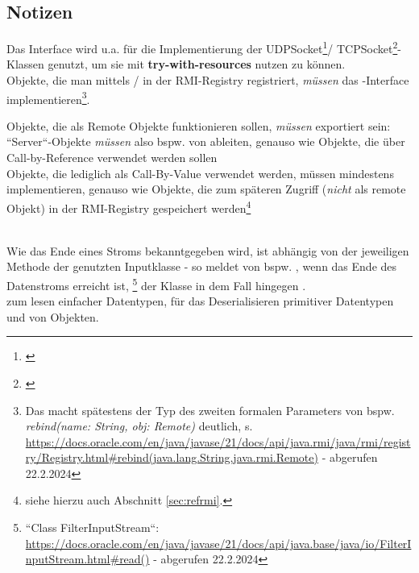 \subsection{Notizen}
Das Interface  wird u.a. für die Implementierung der UDPSocket\footnote{\cite[269, Listing 5.1]{Oec22}}/ TCPSocket\footnote{\cite[286, Listing 5.7]{Oec22}}-Klassen genutzt, um sie mit \textbf{try-with-resources} nutzen zu können.\\

\noindent
Objekte, die man mittels /  in der RMI-Registry registriert, \textit{müssen} das -Interface implementieren\footnote{
Das macht spätestens der Typ des zweiten formalen Parameters von bspw. \textit{rebind(name: String, obj: Remote)} deutlich, s. \url{https://docs.oracle.com/en/java/javase/21/docs/api/java.rmi/java/rmi/registry/Registry.html#rebind(java.lang.String,java.rmi.Remote)} - abgerufen 22.2.2024
}.

\begin{tcolorbox}
Objekte, die als Remote Objekte funktionieren sollen, \textit{müssen} exportiert sein: ``Server``-Objekte \textit{müssen} also bspw. von  ableiten, genauso wie Objekte, die über Call-by-Reference verwendet werden sollen\\

    \noindent
    Objekte, die lediglich als Call-By-Value verwendet werden, müssen mindestens  implementieren, genauso wie Objekte, die zum späteren Zugriff (\textit{nicht} als remote Objekt) in der RMI-Registry gespeichert werden\footnote{
        siehe hierzu auch Abschnitt \ref{sec:refrmi}.
}
\end{tcolorbox}\\

\noindent
Wie das Ende eines Stroms bekanntgegeben wird, ist abhängig von der jeweiligen Methode der genutzten Inputklasse - so meldet  von  bspw. , wenn das Ende des Datenstroms erreicht ist, \footnote{
    ``Class FilterInputStream``: \url{https://docs.oracle.com/en/java/javase/21/docs/api/java.base/java/io/FilterInputStream.html#read()} - abgerufen 22.2.2024
} der Klasse  in dem Fall hingegen .\\

\noindent
{} zum lesen einfacher Datentypen,  für das Deserialisieren primitiver Datentypen und von Objekten.\\

